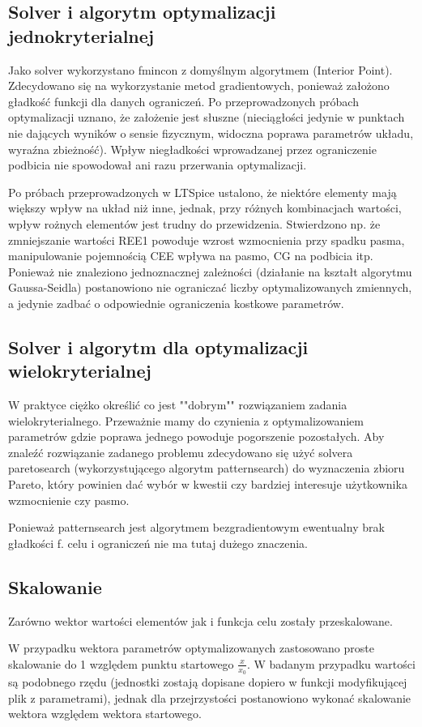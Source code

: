 \documentclass{article}
\begin{document}
\subsection*{Solver i algorytm optymalizacji jednokryterialnej}
Jako solver wykorzystano fmincon z domyślnym algorytmem (Interior Point). Zdecydowano się na wykorzystanie
metod gradientowych, ponieważ założono gładkość funkcji dla danych ograniczeń. Po przeprowadzonych próbach optymalizacji uznano, że założenie jest słuszne (nieciągłości jedynie w punktach nie dających wyników o sensie fizycznym, widoczna poprawa parametrów układu, wyraźna zbieżność).
Wpływ niegładkości wprowadzanej przez ograniczenie podbicia nie spowodował ani razu przerwania optymalizacji.

Po próbach przeprowadzonych w LTSpice ustalono, że niektóre elementy mają większy wpływ na układ niż inne, jednak, przy różnych kombinacjach wartości, wpływ rożnych elementów jest trudny do przewidzenia.
Stwierdzono np. że zmniejszanie wartości REE1 powoduje wzrost wzmocnienia przy spadku pasma, manipulowanie pojemnością CEE wpływa na pasmo, CG na podbicia itp.
Ponieważ nie znaleziono jednoznacznej zależności (działanie na kształt algorytmu Gaussa-Seidla) postanowiono nie ograniczać liczby optymalizowanych zmiennych, a jedynie zadbać o odpowiednie
ograniczenia kostkowe parametrów.
\subsection*{Solver i algorytm dla optymalizacji wielokryterialnej}
W praktyce ciężko określić co jest ""dobrym"" rozwiązaniem zadania wielokryterialnego. Przeważnie mamy do czynienia z optymalizowaniem parametrów gdzie poprawa jednego powoduje pogorszenie pozostałych.
Aby znaleźć rozwiązanie zadanego problemu zdecydowano się użyć solvera paretosearch (wykorzystującego algorytm patternsearch) do wyznaczenia zbioru Pareto, który powinien dać wybór w kwestii czy bardziej interesuje użytkownika
wzmocnienie czy pasmo.

Ponieważ patternsearch jest algorytmem bezgradientowym ewentualny brak gładkości f. celu i ograniczeń nie ma tutaj dużego znaczenia.
\subsection*{Skalowanie}
Zarówno wektor wartości elementów jak i funkcja celu zostały przeskalowane.

W przypadku wektora parametrów optymalizowanych zastosowano proste skalowanie do 1 względem punktu startowego $\frac{x}{x_0}$.
W badanym przypadku wartości są podobnego rzędu (jednostki zostają dopisane dopiero w funkcji modyfikującej plik z parametrami), jednak dla przejrzystości postanowiono wykonać
skalowanie wektora względem wektora startowego.
\end{document}
